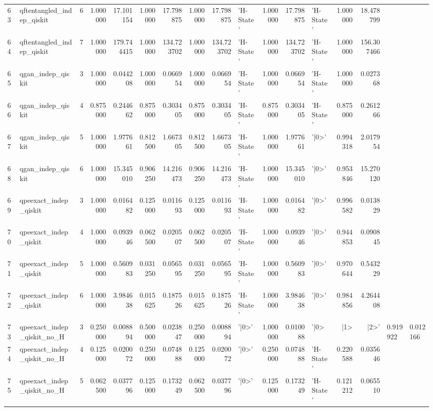\begin{table}
\begin{tabular}{llrrrrrrrlrrlrr}
63 & qftentangled_indep_qiskit & 6 & 1.000000 & 17.101154 & 1.000000 & 17.798875 & 1.000000 & 17.798875 & 'H-State' & 1.000000 & 17.798875 & 'H-State' & 1.000000 & 18.478799 \\
64 & qftentangled_indep_qiskit & 7 & 1.000000 & 179.744415 & 1.000000 & 134.723702 & 1.000000 & 134.723702 & 'H-State' & 1.000000 & 134.723702 & 'H-State' & 1.000000 & 156.307466 \\
65 & qgan_indep_qiskit & 3 & 1.000000 & 0.044208 & 1.000000 & 0.066954 & 1.000000 & 0.066954 & 'H-State' & 1.000000 & 0.066954 & 'H-State' & 1.000000 & 0.027368 \\
66 & qgan_indep_qiskit & 4 & 0.875000 & 0.244662 & 0.875000 & 0.303405 & 0.875000 & 0.303405 & 'H-State' & 0.875000 & 0.303405 & 'H-State' & 0.875000 & 0.261266 \\
67 & qgan_indep_qiskit & 5 & 1.000000 & 1.977661 & 0.812500 & 1.667305 & 0.812500 & 1.667305 & 'H-State' & 1.000000 & 1.977661 & '|0>' & 0.994318 & 2.017954 \\
68 & qgan_indep_qiskit & 6 & 1.000000 & 15.345010 & 0.906250 & 14.216473 & 0.906250 & 14.216473 & 'H-State' & 1.000000 & 15.345010 & '|0>' & 0.953846 & 15.270120 \\
69 & qpeexact_indep_qiskit & 3 & 1.000000 & 0.016482 & 0.125000 & 0.011693 & 0.125000 & 0.011693 & 'H-State' & 1.000000 & 0.016482 & '|0>' & 0.996582 & 0.013829 \\
70 & qpeexact_indep_qiskit & 4 & 1.000000 & 0.093946 & 0.062500 & 0.020507 & 0.062500 & 0.020507 & 'H-State' & 1.000000 & 0.093946 & '|0>' & 0.944853 & 0.090845 \\
71 & qpeexact_indep_qiskit & 5 & 1.000000 & 0.560983 & 0.031250 & 0.056595 & 0.031250 & 0.056595 & 'H-State' & 1.000000 & 0.560983 & '|0>' & 0.970644 & 0.543229 \\
72 & qpeexact_indep_qiskit & 6 & 1.000000 & 3.984638 & 0.015625 & 0.187526 & 0.015625 & 0.187526 & 'H-State' & 1.000000 & 3.984638 & '|0>' & 0.984856 & 4.264408 \\
73 & qpeexact_indep_qiskit_no_H & 3 & 0.250000 & 0.008894 & 0.500000 & 0.023847 & 0.250000 & 0.008894 & '|0>' & 1.000000 & 0.010088 & '|0> & |1> & |2>' & 0.919922 & 0.012166 \\
74 & qpeexact_indep_qiskit_no_H & 4 & 0.125000 & 0.020072 & 0.250000 & 0.074888 & 0.125000 & 0.020072 & '|0>' & 0.250000 & 0.074888 & 'H-State' & 0.220588 & 0.035646 \\
75 & qpeexact_indep_qiskit_no_H & 5 & 0.062500 & 0.037796 & 0.125000 & 0.173249 & 0.062500 & 0.037796 & '|0>' & 0.125000 & 0.173249 & 'H-State' & 0.121212 & 0.065510 \\

\end{tabular}
\end{table}
